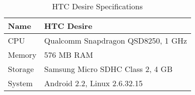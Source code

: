 \begin{table}
  \centering
  \caption{HTC Desire Specifications}
  \begin{tabular}{ | l | l |}
    \hline
    Name    & HTC Desire                        \\ \hline
    CPU     & Qualcomm Snapdragon QSD8250, 1 GHz \\ \hline
    Memory  & 576 MB \ac{RAM}                   \\ \hline
    Storage & Samsung Micro SDHC Class 2, 4 GB  \\ \hline
    System  & Android 2.2, Linux 2.6.32.15      \\ \hline
  \end{tabular}
  \label{tbl:device:desire}
\end{table}
